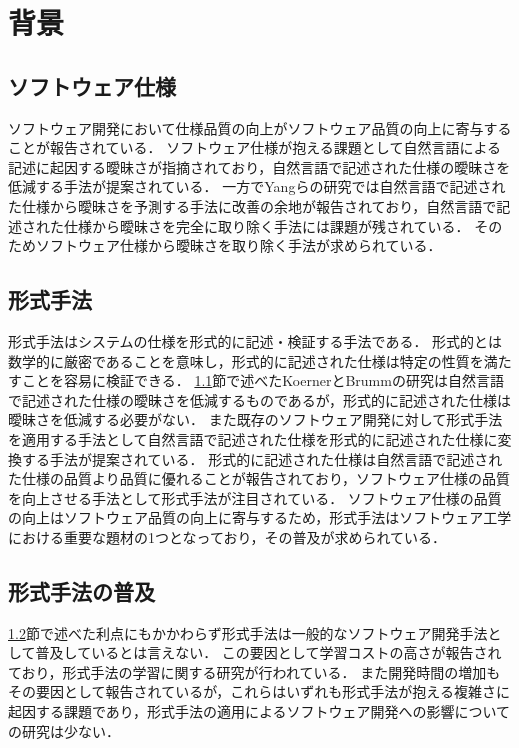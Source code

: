 \documentclass[main]{subfiles}
\begin{document}
\chapter{背景}

\section{ソフトウェア仕様}
\label{sec:specification}

ソフトウェア開発において仕様品質の向上がソフトウェア品質の向上に寄与することが報告されている\cite{knauss:2009}．
ソフトウェア仕様が抱える課題として自然言語による記述に起因する曖昧さが指摘されており\cite{kamsties:2005}，自然言語で記述された仕様の曖昧さを低減する手法が提案されている\cite{korner:2009,yang:2011}．
一方でYangらの研究では自然言語で記述された仕様から曖昧さを予測する手法に改善の余地が報告されており，自然言語で記述された仕様から曖昧さを完全に取り除く手法には課題が残されている．
そのためソフトウェア仕様から曖昧さを取り除く手法が求められている．

\section{形式手法}
\label{sec:formal-method}

形式手法はシステムの仕様を形式的に記述・検証する手法である．
形式的とは数学的に厳密であることを意味し，形式的に記述された仕様は特定の性質を満たすことを容易に検証できる．
\ref{sec:specification}節で述べたKoernerとBrummの研究は自然言語で記述された仕様の曖昧さを低減するものであるが，形式的に記述された仕様は曖昧さを低減する必要がない．
また既存のソフトウェア開発に対して形式手法を適用する手法として自然言語で記述された仕様を形式的に記述された仕様に変換する手法が提案されている\cite{ilieva:2005}．
形式的に記述された仕様は自然言語で記述された仕様の品質より品質に優れることが報告されており\cite{fabbrini:2001}，ソフトウェア仕様の品質を向上させる手法として形式手法が注目されている．%
ソフトウェア仕様の品質の向上はソフトウェア品質の向上に寄与するため，形式手法はソフトウェア工学における重要な題材の1つとなっており，その普及が求められている．

\section{形式手法の普及}

\ref{sec:formal-method}節で述べた利点にもかかわらず形式手法は一般的なソフトウェア開発手法として普及しているとは言えない．
この要因として学習コストの高さが報告されており\cite{kurita:2011}，形式手法の学習に関する研究が行われている\cite{ohnishi:2020,araki:2010,araki:2011}．
また開発時間の増加もその要因として報告されている\cite{kitamura:2021}が，これらはいずれも形式手法が抱える複雑さに起因する課題であり，形式手法の適用によるソフトウェア開発への影響についての研究は少ない．
\end{document}
